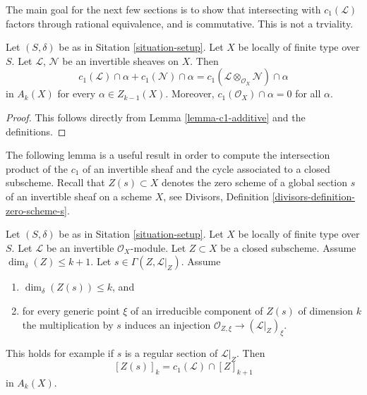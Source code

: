 \medskip\noindent
The main goal for the next few sections is to show that intersecting with
$c_1(\mathcal{L})$ factors through rational equivalence, and is commutative.
This is not a trviality.

\begin{lemma}
\label{lemma-c1-cap-additive}
Let $(S, \delta)$ be as in Sitation \ref{situation-setup}.
Let $X$ be locally of finite type over $S$.
Let $\mathcal{L}$, $\mathcal{N}$ be an invertible sheaves on $X$.
Then
$$
c_1(\mathcal{L}) \cap \alpha  + c_1(\mathcal{N}) \cap \alpha =
c_1(\mathcal{L} \otimes_{\mathcal{O}_X} \mathcal{N}) \cap \alpha
$$
in $A_k(X)$ for every $\alpha \in Z_{k - 1}(X)$. Moreover, 
$c_1(\mathcal{O}_X) \cap \alpha = 0$ for all $\alpha$.
\end{lemma}

\begin{proof}
This follows directly from Lemma \ref{lemma-c1-additive} and the definitions.
\end{proof}

\noindent
The following lemma is a useful result in order to compute the intersection
product of the $c_1$ of an invertible sheaf and the cycle associated
to a closed subscheme.
Recall that $Z(s) \subset X$ denotes the zero scheme of a global section
$s$ of an invertible sheaf on a scheme $X$, see
Divisors, Definition \ref{divisors-definition-zero-scheme-s}.

\begin{lemma}
\label{lemma-geometric-cap}
Let $(S, \delta)$ be as in Sitation \ref{situation-setup}.
Let $X$ be locally of finite type over $S$.
Let $\mathcal{L}$ be an invertible $\mathcal{O}_X$-module.
Let $Z \subset X$ be a closed subscheme.
Assume $\dim_\delta(Z) \leq k + 1$.
Let $s \in \Gamma(Z, \mathcal{L}|_Z)$.
Assume
\begin{enumerate}
\item $\dim_\delta(Z(s)) \leq k$, and
\item for every generic point $\xi$ of an irreducible component of
$Z(s)$ of dimension $k$ the multiplication by $s$
induces an injection $\mathcal{O}_{Z, \xi} \to (\mathcal{L}|_Z)_\xi$.
\end{enumerate}
This holds for example if $s$ is a regular section of $\mathcal{L}|_Z$.
Then
$$
[Z(s)]_k = c_1(\mathcal{L}) \cap [Z]_{k + 1}
$$
in $A_k(X)$.
\end{lemma}

